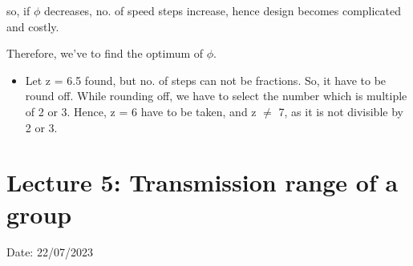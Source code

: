 \documentclass{article}
\begin{document}
so, if $\phi$ decreases, no. of speed steps increase, hence design becomes complicated and costly.

Therefore, we've to find the optimum of $\phi$. 

\begin{itemize}
  \item Let z = 6.5 found, but no. of steps can not be fractions. So, it have to be round off. While rounding off, we have to select the number which is multiple of 2 or 3. Hence, z = 6 have to be taken, and z $\neq$ 7, as it is not divisible by 2 or 3. 
\end{itemize}
\vspace*{1cm}

\section{Lecture 5: Transmission range of a group}
\hfill Date: 22/07/2023
 
\end{document}
